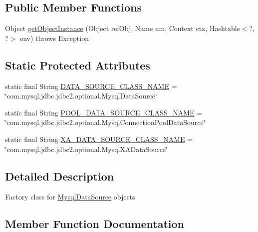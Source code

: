 \subsection*{Public Member Functions}
\begin{DoxyCompactItemize}
\item 
Object \mbox{\hyperlink{classcom_1_1mysql_1_1jdbc_1_1jdbc2_1_1optional_1_1_mysql_data_source_factory_a0cfa2574e8030765a671f4591628ce10}{get\+Object\+Instance}} (Object ref\+Obj, Name nm, Context ctx, Hashtable$<$?, ?$>$ env)  throws Exception 
\end{DoxyCompactItemize}
\subsection*{Static Protected Attributes}
\begin{DoxyCompactItemize}
\item 
static final String \mbox{\hyperlink{classcom_1_1mysql_1_1jdbc_1_1jdbc2_1_1optional_1_1_mysql_data_source_factory_a6a0e24101dde5d3015d875de278cb99f}{D\+A\+T\+A\+\_\+\+S\+O\+U\+R\+C\+E\+\_\+\+C\+L\+A\+S\+S\+\_\+\+N\+A\+ME}} = \char`\"{}com.\+mysql.\+jdbc.\+jdbc2.\+optional.\+Mysql\+Data\+Source\char`\"{}
\item 
static final String \mbox{\hyperlink{classcom_1_1mysql_1_1jdbc_1_1jdbc2_1_1optional_1_1_mysql_data_source_factory_aa7b4238c05b4d0cfc970f263ea7860fc}{P\+O\+O\+L\+\_\+\+D\+A\+T\+A\+\_\+\+S\+O\+U\+R\+C\+E\+\_\+\+C\+L\+A\+S\+S\+\_\+\+N\+A\+ME}} = \char`\"{}com.\+mysql.\+jdbc.\+jdbc2.\+optional.\+Mysql\+Connection\+Pool\+Data\+Source\char`\"{}
\item 
static final String \mbox{\hyperlink{classcom_1_1mysql_1_1jdbc_1_1jdbc2_1_1optional_1_1_mysql_data_source_factory_aedf252dc9f428dc8e170006bb1a85086}{X\+A\+\_\+\+D\+A\+T\+A\+\_\+\+S\+O\+U\+R\+C\+E\+\_\+\+C\+L\+A\+S\+S\+\_\+\+N\+A\+ME}} = \char`\"{}com.\+mysql.\+jdbc.\+jdbc2.\+optional.\+Mysql\+X\+A\+Data\+Source\char`\"{}
\end{DoxyCompactItemize}


\subsection{Detailed Description}
Factory class for \mbox{\hyperlink{classcom_1_1mysql_1_1jdbc_1_1jdbc2_1_1optional_1_1_mysql_data_source}{Mysql\+Data\+Source}} objects 

\subsection{Member Function Documentation}
\mbox{\label{classcom_1_1mysql_1_1jdbc_1_1jdbc2_1_1optional_1_1_mysql_data_source_factory_a0cfa2574e8030765a671f4591628ce10}} 

